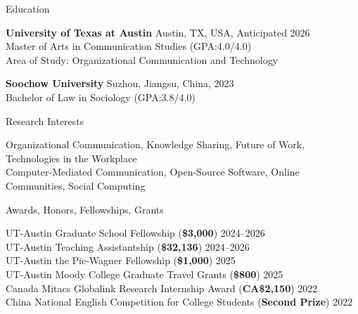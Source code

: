 \documentclass[
	11pt, %
]{resume} %
\begin{document}

\begin{rSection}{Education}
	
	\textbf{University of Texas at Austin} \hfill Austin, TX, USA, Anticipated 2026 \\ 
	Master of Arts in Communication Studies (GPA:4.0/4.0) \\
	Area of Study: Organizational Communication and Technology 

    \textbf{Soochow University} \hfill Suzhou, Jiangsu, China, 2023 \\
	Bachelor of Law in Sociology (GPA:3.8/4.0) 
	
\end{rSection}

\begin{rSection}{Research Interests}

Organizational Communication, Knowledge Sharing, Future of Work, Technologies in the Workplace\\
Computer-Mediated Communication, Open-Source Software, Online Communities, Social Computing

\end{rSection}


\begin{rSection}{Awards, Honors, Fellowships, Grants}
	
	UT-Austin Graduate School Fellowship   (\textbf{\$3,000})  \hfill 2024--2026\\
    UT-Austin Teaching Assistantship  (\textbf{\$32,136})  \hfill 2024--2026\\
    UT-Austin the Pic-Wagner Fellowship (\textbf{\$1,000})  \hfill 2025\\
    UT-Austin Moody College Graduate Travel Grants (\textbf{\$800})  \hfill 2025\\
    Canada Mitacs Globalink Research Internship Award     (\textbf{CA\$2,150})  \hfill 2022\\  
    China National English Competition for College Students (\textbf{Second Prize})  \hfill 2022
	
\end{rSection}
\end{document}
